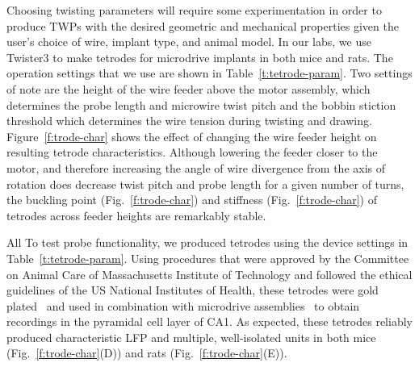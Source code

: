 \documentclass[11pt,a4paper]{article}
\begin{document}
Choosing twisting parameters will require some experimentation in order to
produce TWPs with the desired geometric and mechanical properties given the
user's choice of wire, implant type, and animal model. In our labs, we use
Twister3 to make tetrodes for microdrive implants in both mice and rats. The
operation settings that we use are shown in Table~\ref{t:tetrode-param}.  Two
settings of note are the height of the wire feeder above the motor assembly,
which determines the probe length and microwire twist pitch and the bobbin
stiction threshold which determines the wire tension during twisting and
drawing.  Figure~\ref{f:trode-char} shows the effect of changing the wire
feeder height on resulting tetrode characteristics. Although lowering the
feeder closer to the motor, and therefore increasing the angle of wire
divergence from the axis of rotation does decrease twist pitch and probe length
for a given number of turns, the buckling point (Fig.~\ref{f:trode-char}) and
stiffness (Fig.~\ref{f:trode-char}) of tetrodes across feeder heights are
remarkably stable.

All To test probe functionality, we produced tetrodes using the device settings
in Table~\ref{t:tetrode-param}. Using procedures that were approved by the
Committee on Animal Care of Massachusetts Institute of Technology and followed
the ethical guidelines of the US National Institutes of Health, these tetrodes
were gold plated~\cite{Nguyen2009} and used in combination with microdrive
assemblies~\cite{Voigts2013,Kloosterman2009} to obtain recordings in the
pyramidal cell layer of CA1. As expected, these tetrodes reliably produced
characteristic LFP and multiple, well-isolated units in both mice
(Fig.~\ref{f:trode-char}(D)) and rats (Fig.~\ref{f:trode-char}(E)).
\end{document}
